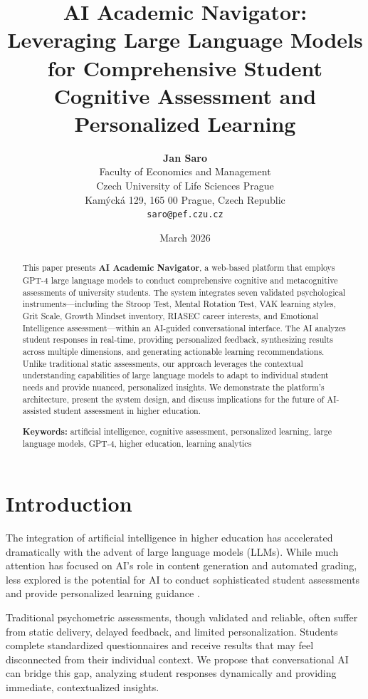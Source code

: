 \documentclass[11pt,a4paper]{article}
\title{\textbf{AI Academic Navigator: Leveraging Large Language Models for Comprehensive Student Cognitive Assessment and Personalized Learning}}
\author{
    \textbf{Jan Saro}\\
    Faculty of Economics and Management\\
    Czech University of Life Sciences Prague\\
    Kamýcká 129, 165 00 Prague, Czech Republic\\
    \texttt{saro@pef.czu.cz}
}
\date{March 2026}
\begin{document}
\maketitle

\begin{abstract}
\noindent
This paper presents \textbf{AI Academic Navigator}, a web-based platform that employs GPT-4 large language models to conduct comprehensive cognitive and metacognitive assessments of university students. The system integrates seven validated psychological instruments---including the Stroop Test, Mental Rotation Test, VAK learning styles, Grit Scale, Growth Mindset inventory, RIASEC career interests, and Emotional Intelligence assessment---within an AI-guided conversational interface. The AI analyzes student responses in real-time, providing personalized feedback, synthesizing results across multiple dimensions, and generating actionable learning recommendations. Unlike traditional static assessments, our approach leverages the contextual understanding capabilities of large language models to adapt to individual student needs and provide nuanced, personalized insights. We demonstrate the platform's architecture, present the system design, and discuss implications for the future of AI-assisted student assessment in higher education.

\vspace{0.5em}
\noindent\textbf{Keywords:} artificial intelligence, cognitive assessment, personalized learning, large language models, GPT-4, higher education, learning analytics
\end{abstract}

\section{Introduction}

The integration of artificial intelligence in higher education has accelerated dramatically with the advent of large language models (LLMs). While much attention has focused on AI's role in content generation and automated grading, less explored is the potential for AI to conduct sophisticated student assessments and provide personalized learning guidance \citep{openai2023gpt4}.

Traditional psychometric assessments, though validated and reliable, often suffer from static delivery, delayed feedback, and limited personalization. Students complete standardized questionnaires and receive results that may feel disconnected from their individual context. We propose that conversational AI can bridge this gap, analyzing student responses dynamically and providing immediate, contextualized insights.
\end{document}
